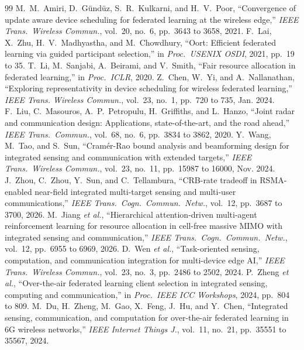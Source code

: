 \documentclass[lettersize,journal]{IEEEtran}
\begin{document}
\begin{thebibliography}{99}
 M.~M.~Amiri, D.~G\"und\"uz, S.~R.~Kulkarni, and H.~V.~Poor, ``Convergence of update aware device scheduling for federated learning at the wireless edge,'' \emph{IEEE Trans.\ Wireless Commun.}, vol.~20, no.~6, pp.~3643 to 3658, 2021.
 F.~Lai, X.~Zhu, H.~V.~Madhyastha, and M.~Chowdhury, ``Oort: Efficient federated learning via guided participant selection,'' in \emph{Proc.\ USENIX OSDI}, 2021, pp.~19 to 35.
 T.~Li, M.~Sanjabi, A.~Beirami, and V.~Smith, ``Fair resource allocation in federated learning,'' in \emph{Proc.\ ICLR}, 2020.
 Z.~Chen, W.~Yi, and A.~Nallanathan, ``Exploring representativity in device scheduling for wireless federated learning,'' \emph{IEEE Trans. Wireless Commun.}, vol.~23, no.~1, pp.~720 to 735, Jan. 2024.
 F.~Liu, C.~Masouros, A.~P.~Petropulu, H.~Griffiths, and L.~Hanzo, ``Joint radar and communication design: Applications, state-of-the-art, and the road ahead,'' \emph{IEEE Trans.\ Commun.}, vol.~68, no.~6, pp.~3834 to 3862, 2020.
 Y.~Wang, M.~Tao, and S.~Sun, ``Cram\'er-Rao bound analysis and beamforming design for integrated sensing and communication with extended targets,'' \emph{IEEE Trans.\ Wireless Commun.}, vol.~23, no.~11, pp.~15987 to 16000, Nov. 2024.
 J.~Zhou, C.~Zhou, Y.~Sun, and C.~Tellambura, ``CRB-rate tradeoff in RSMA-enabled near-field integrated multi-target sensing and multi-user communications,'' \emph{IEEE Trans.\ Cogn.\ Commun.\ Netw.}, vol.~12, pp.~3687 to 3700, 2026.
 M.~Jiang \emph{et al.}, ``Hierarchical attention-driven multi-agent reinforcement learning for resource allocation in cell-free massive MIMO with integrated sensing and communication,'' \emph{IEEE Trans.\ Cogn.\ Commun.\ Netw.}, vol.~12, pp.~6955 to 6969, 2026.
 D.~Wen \emph{et al.}, ``Task-oriented sensing, computation, and communication integration for multi-device edge AI,'' \emph{IEEE Trans.\ Wireless Commun.}, vol.~23, no.~3, pp.~2486 to 2502, 2024.
 P.~Zheng \emph{et al.}, ``Over-the-air federated learning client selection in integrated sensing, computing and communication,'' in \emph{Proc.\ IEEE ICC Workshops}, 2024, pp.~804 to 809.
 M.~Du, H.~Zheng, M.~Gao, X.~Feng, J.~Hu, and Y.~Chen, ``Integrated sensing, communication, and computation for over-the-air federated learning in 6G wireless networks,'' \emph{IEEE Internet Things J.}, vol.~11, no.~21, pp.~35551 to 35567, 2024.

\end{thebibliography}
\end{document}
